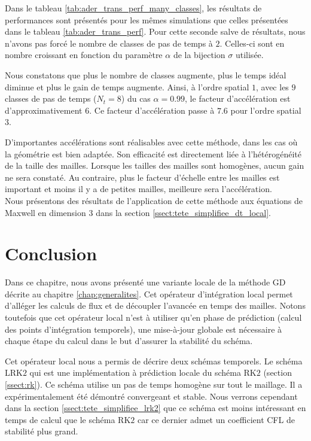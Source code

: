 Dans le tableau \ref{tab:ader_trans_perf_many_classes}, les résultats
de performances sont présentés pour les mêmes simulations que celles
présentées dans le tableau \ref{tab:ader_trans_perf}.
Pour cette seconde salve de résultats, nous n'avons pas forcé le nombre
de classes de pas de temps à $2$. Celles-ci sont en nombre croissant en
fonction du paramètre $\alpha$ de la bijection $\sigma$ utilisée.

Nous constatons que plus le nombre de classes augmente, plus le temps
idéal diminue et plus le gain de temps augmente.
Ainsi, à l'ordre spatial $1$, avec les $9$ classes de pas de temps ($N_t=8$)
du cas $\alpha = 0.99$, le facteur d'accélération est d'approximativement $6$.
Ce facteur d'accélération passe à $7.6$ pour l'ordre spatial $3$.

D'importantes accélérations sont réalisables avec cette méthode,
dans les cas où la géométrie est bien adaptée.
Son efficacité est directement liée à l'hétérogénéité de la taille des mailles.
Lorsque les tailles des mailles sont homogènes, aucun gain ne sera constaté.
Au contraire, plus le facteur d'échelle entre les mailles est important
et moins il y a de petites mailles, meilleure sera l'accélération.
\\

Nous présentons des résultats de l'application
de cette méthode aux équations de Maxwell en dimension $3$
dans la section \ref{ssect:tete_simplifiee_dt_local}.
\\


\section*{Conclusion}


Dans ce chapitre, nous avons présenté
une variante locale de la méthode GD décrite au chapitre
\ref{chap:generalites}. Cet opérateur d'intégration local
permet d'alléger les calculs de flux et de découpler l'avancée en
temps des mailles. Notons toutefois que cet opérateur local
n'est à utiliser qu'en phase de prédiction (calcul des points
d'intégration temporels), une mise-à-jour
globale est nécessaire à chaque étape du calcul
dans le but d'assurer la stabilité du schéma.

Cet opérateur local nous a permis de décrire deux schémas temporels.
Le schéma LRK$2$ qui est une implémentation à prédiction locale
du schéma RK$2$ (section \ref{ssect:rk}). Ce schéma utilise
un pas de temps homogène sur tout le maillage.
Il a expérimentalement été démontré convergeant et stable.
Nous verrons cependant dans la section \ref{ssect:tete_simplifiee_lrk2}
que ce schéma est moins intéressant en temps de calcul que le schéma RK$2$
car ce dernier admet un coefficient CFL de stabilité
plus grand.

